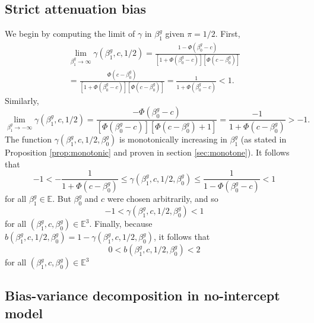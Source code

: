 \documentclass[12pt]{article}
\begin{document}
\begin{appendices}
\begin{refsection}
		\subsection{Strict attenuation bias}\label{sec:att_bias}
		
		We begin by computing the limit of $\gamma$ in $\beta^g_1$ given $\pi = 1/2$.  First,
		\begin{multline*}
		\lim_{\beta^g_1 \to \infty} \gamma(\beta^g_1, c, 1/2) = \frac{1 - \Phi(\beta^g_0 - c)}{\left[1 + \Phi(\beta^g_0 - c) \right] \left[\Phi(c - \beta^g_0) \right]} \\ = \frac{\Phi(c - \beta^g_0)}{ \left[1 + \Phi(\beta^g_0 - c) \right] \left[\Phi(c - \beta^g_0) \right]} = \frac{1}{1 + \Phi(\beta^g_0 - c)} < 1.
		\end{multline*}
		Similarly,
		\begin{equation*}
		\lim_{\beta^g_1 \to -\infty} \gamma(\beta^g_1, c, 1/2) = \frac{ - \Phi(\beta^g_0 - c)}{\left[\Phi(\beta^g_0 - c)\right] \left[\Phi(c - \beta^g_0) + 1 \right]} = \frac{-1}{1 + \Phi(c - \beta^g_0)} > -1.
		\end{equation*}
		The function $\gamma(\beta^g_1, c, 1/2, \beta^g_0)$ is monotonically increasing in $\beta^g_1$ (as stated in Proposition \ref{prop:monotonic} and proven in section \ref{sec:monotone}). It follows that 
		$$-1 < -\frac{1}{1 + \Phi(c - \beta^g_0)} \leq \gamma(\beta^g_1, c, 1/2, \beta^g_0) \leq \frac{1}{1 - \Phi(\beta^g_0 - c)} < 1$$ for all $\beta^g_1 \in \mathbb{E}$. But $\beta^g_0$ and $c$ were chosen arbitrarily, and so
		$$-1 < \gamma(\beta^g_1, c, 1/2, \beta^g_0) < 1$$ for all $(\beta^g_1, c, \beta^g_0) \in \mathbb{E}^3$. Finally, because $b(\beta^g_1, c, 1/2, \beta^g_0) = 1 - \gamma(\beta^g_1, c, 1/2, \beta^g_0)$, it follows that
		$$ 0 < b(\beta^g_1, c, 1/2, \beta^g_0) < 2$$ for all $(\beta^g_1, c, \beta^g_0) \in \mathbb{E}^3$
		
		\subsection{Bias-variance decomposition in no-intercept model}\label{sec:bv_decomp}
		

\end{refsection}
\end{appendices}
\end{document}
